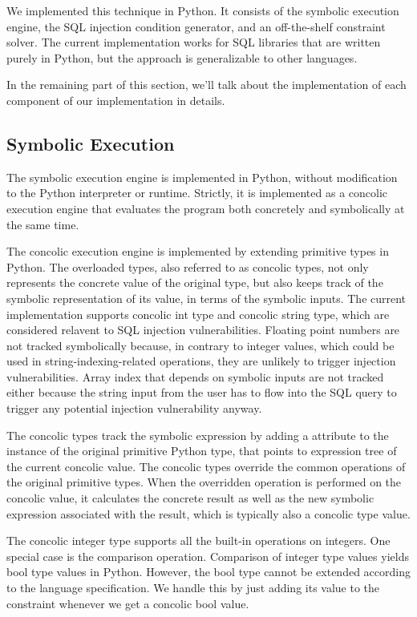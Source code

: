\documentclass[conference]{IEEEtran}
\begin{document}
We implemented this technique in Python. It consists of the symbolic execution engine, the SQL injection condition generator, and an off-the-shelf constraint solver.
The current implementation works for SQL libraries that are written purely in Python, but the approach is generalizable to other languages.

In the remaining part of this section, we'll talk about the implementation of each component of our implementation in details.

\subsection{Symbolic Execution}

The symbolic execution engine is implemented in Python, without modification to the Python interpreter or runtime. Strictly, it is implemented as a concolic execution engine that evaluates the program both concretely and symbolically at the same time.

The concolic execution engine is implemented by extending primitive types in Python. The overloaded types, also referred to as concolic types, not only represents the concrete value of the original type, but also keeps track of the symbolic representation of its value, in terms of the symbolic inputs. The current implementation supports concolic int type and concolic string type, which are considered relavent to SQL injection vulnerabilities. Floating point numbers are not tracked symbolically because, in contrary to integer values, which could be used in string-indexing-related operations, they are unlikely to trigger injection vulnerabilities. Array index that depends on symbolic inputs are not tracked either because the string input from the user has to flow into the SQL query to trigger any potential injection vulnerability anyway.

The concolic types track the symbolic expression by adding a attribute to the instance of the original primitive Python type, that points to expression tree of the current concolic value. The concolic types override the common operations of the original primitive types. When the overridden operation is performed on the concolic value, it calculates the concrete result as well as the new symbolic expression associated with the result, which is typically also a concolic type value.

The concolic integer type supports all the built-in operations on integers. One special case is the comparison operation. Comparison of integer type values yields bool type values in Python. However, the bool type cannot be extended according to the language specification. We handle this by just adding its value to the constraint whenever we get a concolic bool value.
\end{document}
